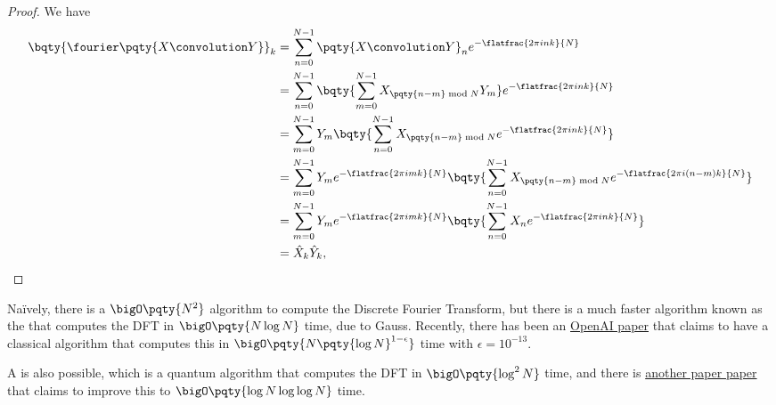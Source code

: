 \begin{proof}
    We have
    \begin{subequations}
        \begin{align}
            \bqty{\fourier \pqty{X \convolution Y}}_k &= \sum_{n = 0}^{N - 1} \pqty{X \convolution Y}_n e^{- \flatfrac{2 \pi i n k}{N}} \\
            &= \sum_{n = 0}^{N - 1} \bqty{\sum_{m = 0}^{N - 1} X_{\pqty{n - m} \bmod N} Y_m} e^{- \flatfrac{2 \pi i n k}{N}} \\
            &= \sum_{m = 0}^{N - 1} Y_m \bqty{\sum_{n = 0}^{N - 1} X_{\pqty{n - m} \bmod N} e^{- \flatfrac{2 \pi i n k}{N}}} \\
            &= \sum_{m = 0}^{N - 1} Y_m e^{- \flatfrac{2 \pi i m k}{N}} \bqty{\sum_{n = 0}^{N - 1} X_{\pqty{n - m} \bmod N} e^{- \flatfrac{2 \pi i (n - m) k}{N}}} \\
            &= \sum_{m = 0}^{N - 1} Y_m e^{- \flatfrac{2 \pi i m k}{N}} \bqty{\sum_{n = 0}^{N - 1} X_n e^{- \flatfrac{2 \pi i n k}{N}}} \\
            &= \hat{X}_k \hat{Y}_k,
        \end{align}
    \end{subequations}
\end{proof}

\small

Na\"ively, there is a \(\bigO\pqty{N^2}\) algorithm to compute the Discrete Fourier Transform, but there is a much faster algorithm known as the  that computes the DFT in \(\bigO\pqty{N \log N}\) time, due to Gauss. Recently, there has been an \href{https://github.com/openai/math/blob/main/preprints/An-explicit-power-saving-for-the-exact-discrete-Fourier-transform-September-25-2026/main.pdf}{OpenAI paper} that claims to have a classical algorithm that computes this in \(\bigO\pqty{N \pqty{\log N}^{1 - \epsilon}}\) time with \(\epsilon = 10^{-13}\).

A  is also possible, which is a quantum algorithm that computes the DFT in \(\bigO\pqty{\log^2 N}\) time, and there is \href{https://arxiv.org/abs/2611.06341}{another paper paper} that claims to improve this to \(\bigO\pqty{\log N \log \log N}\) time.

\normalsize